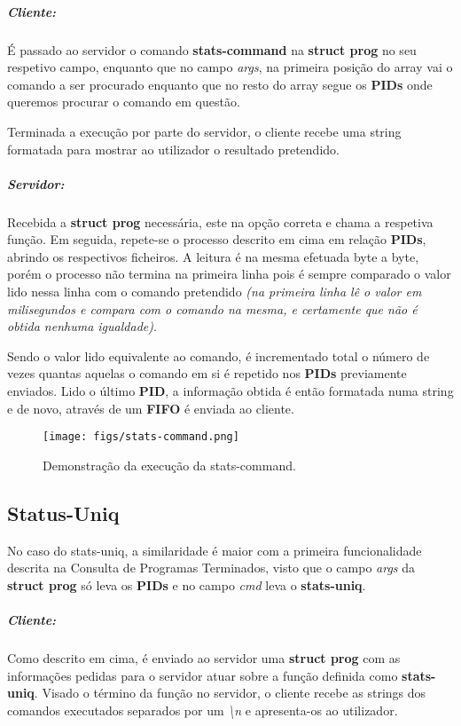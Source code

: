 \documentclass{report}
\begin{document}
\subparagraph{Cliente:}
É passado ao servidor o comando \textbf{stats-command} na \textbf{struct prog} no seu respetivo campo, enquanto que no campo \textit{args}, na primeira posição do array vai o comando a ser procurado enquanto que no resto do array segue os \textbf{PIDs} onde queremos procurar o comando em questão.\par
Terminada a execução por parte do servidor, o cliente recebe uma string formatada para mostrar ao utilizador o resultado pretendido.

\subparagraph{Servidor:}
Recebida a \textbf{struct prog} necessária, este na opção correta e chama a respetiva função. Em seguida, repete-se o processo descrito em cima em relação \textbf{PIDs}, abrindo os respectivos ficheiros. A leitura é na mesma efetuada byte a byte, porém o processo não termina na primeira linha pois é sempre comparado o valor lido nessa linha com o comando pretendido \textit{(na primeira linha lê o valor em milisegundos e compara com o comando na mesma, e certamente que não é obtida nenhuma igualdade)}.\par
Sendo o valor lido equivalente ao comando, é incrementado total o número de vezes quantas aquelas o comando em si é repetido nos \textbf{PIDs} previamente enviados.
Lido o último \textbf{PID}, a informação obtida é então formatada numa string e de novo, através de um \textbf{FIFO} é enviada ao cliente.\\

\begin{figure}[h]
    \centering
    \texttt{[image: figs/stats-command.png]}
    \caption{Demonstração da execução da stats-command.}
    \label{f}
\end{figure}

\newpage
\subsection{Status-Uniq}
No caso do stats-uniq, a similaridade é maior com a primeira funcionalidade descrita na Consulta de Programas Terminados, visto que o campo \textit{args} da \textbf{struct prog} só leva os \textbf{PIDs} e no campo \textit{cmd} leva o \textbf{stats-uniq}.

\subparagraph{Cliente:} Como descrito em cima, é enviado ao servidor uma \textbf{struct prog} com as informações pedidas para o servidor atuar sobre a função definida como \textbf{stats-uniq}.
Visado o término da função no servidor, o cliente recebe as strings dos comandos executados separados por um \textit{\textbackslash n} e apresenta-os ao utilizador.
\end{document}
